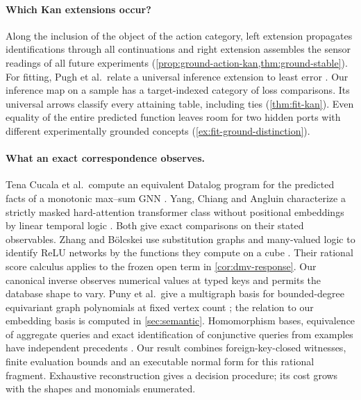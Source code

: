 \documentclass[11pt,a4paper]{article}
\theoremstyle{definition}
\theoremstyle{remark}\newaliascnt{remark}{theorem}
\numberwithin{equation}{section}
\begin{document}
\paragraph{Which Kan extensions occur?}
Along the inclusion of the object of the action category, left extension propagates identifications through all continuations and right extension assembles the sensor readings of all future experiments (\cref{prop:ground-action-kan,thm:ground-stable}). For fitting, Pugh et al.\ relate a universal inference extension to least error \cite[Theorem 3.15]{pugh-kan}. Our inference map on a sample has a target-indexed category of loss comparisons. Its universal arrows classify every attaining table, including ties (\cref{thm:fit-kan}). Even equality of the entire predicted function leaves room for two hidden ports with different experimentally grounded concepts (\cref{ex:fit-ground-distinction}).

\paragraph{What an exact correspondence observes.}
Tena Cucala et al.\ compute an equivalent Datalog program for the predicted facts of a monotonic max--sum GNN \cite{gnn}. Yang, Chiang and Angluin characterize a strictly masked hard-attention transformer class without positional embeddings by linear temporal logic \cite{hard-attn-ltl}. Both give exact comparisons on their stated observables. Zhang and B\"olcskei use substitution graphs and many-valued logic to identify ReLU networks by the functions they compute on a cube \cite{zhang-bolcskei-mv}. Their rational score calculus applies to the frozen open term in \cref{cor:dmv-response}. Our canonical inverse observes numerical values at typed keys and permits the database shape to vary. Puny et al.\ give a multigraph basis for bounded-degree equivariant graph polynomials at fixed vertex count \cite{graph-poly-basis}; the relation to our embedding basis is computed in \cref{sec:semantic}. Homomorphism bases, equivalence of aggregate queries and exact identification of conjunctive queries from examples have independent precedents \cite{motif-basis,aggregate-equivalence,cq-learning}. Our result combines foreign-key-closed witnesses, finite evaluation bounds and an executable normal form for this rational fragment. Exhaustive reconstruction gives a decision procedure; its cost grows with the shapes and monomials enumerated.
\end{document}
